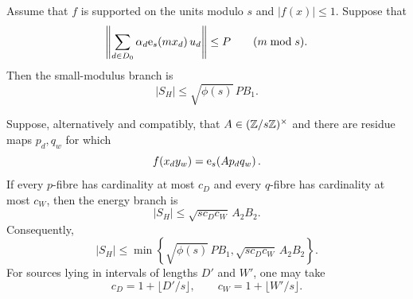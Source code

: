 \begin{theorem}\label{thm:hmrd}
Assume that $f$ is supported on the units modulo $s$ and $|f(x)|\le1$.  Suppose
that
\begin{equation}\label{eq:hmrd-P}
 \left\lVert \sum_{d\in D_0}\alpha_d\mathrm e_{s}\!\left(m x_d\right)u_d\right\rVert\le P
       \qquad (m\bmod s).
\end{equation}
Then the small-modulus branch is
\begin{equation}\label{eq:hmrd-small}
                 |S_H|\le\sqrt{\phi(s)}\,P B_1.
\end{equation}

Suppose, alternatively and compatibly, that $A\in(\mathbb Z/s\mathbb Z)^\times$ and there
are residue maps $p_d,q_w$ for which
\begin{equation}\label{eq:hmrd-phase}
              f(x_dy_w)=\mathrm e_{s}\!\left(A p_dq_w\right).
\end{equation}
If every $p$-fibre has cardinality at most $c_D$ and every $q$-fibre has
cardinality at most $c_W$, then the energy branch is
\begin{equation}\label{eq:hmrd-energy}
             |S_H|\le\sqrt{s c_Dc_W}\,A_2B_2.
\end{equation}
Consequently,
\begin{equation}\label{eq:hmrd-min}
 |S_H|\le
 \min\left\{\sqrt{\phi(s)}\,PB_1,
             \sqrt{s c_Dc_W}\,A_2B_2\right\}.
\end{equation}
For sources lying in intervals of lengths $D'$ and $W'$, one may take
\[
              c_D=1+\lfloor D'/s\rfloor,
 \qquad       c_W=1+\lfloor W'/s\rfloor.
\]
\end{theorem}

